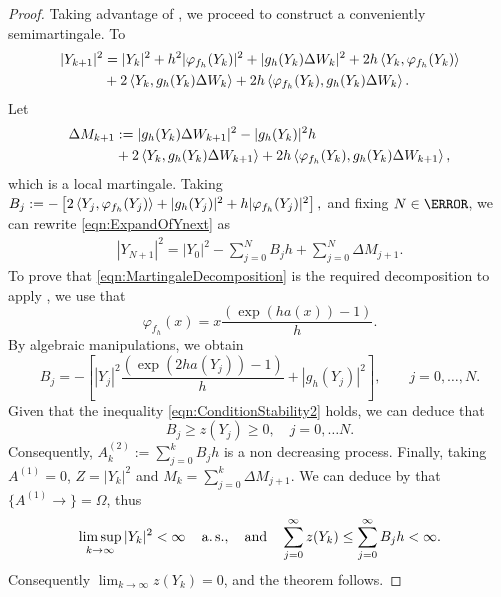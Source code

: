 \begin{proof}
	Taking advantage of , we proceed to construct a conveniently 
	semimartingale. To
	\begin{align}
		|Y_{k+1}|^2
			&=
				|Y_{k}|^2
				+h^2|\varphi_{f_h}(Y_{k})|^2 
				+|g_h(Y_k) \Delta W_k|^2 \notag 
				+2h\left\langle Y_k, \varphi_{f_h}(Y_{k})\right\rangle 
				\notag\\
			&
				+2\left\langle Y_k, g_h(Y_{k})\Delta W_k\right\rangle
				+2h\left\langle\varphi_{f_h}(Y_{k}), g_h(Y_{k})\Delta W_k\right\rangle.
			\label{eqn:ExpandOfYnext}
	\end{align}
	Let 
	\begin{align*}
		\Delta M_{k+1}
			&:=
				|g_h(Y_k)\Delta W_{k+1}|^2 - |g_h(Y_k)|^2 h \notag \\
			&
			+2\left\langle Y_k, g_h(Y_{k})\Delta W_{k+1}\right\rangle
			+2h\left\langle\varphi_{f_h}(Y_{k}), g_h(Y_{k})\Delta W_{k+1}\right\rangle, \notag
	\end{align*}
	which is a local martingale.
	Taking
	$ %
		B_j:=
			-\left[
					2\innerprod{Y_j}{\varphi_{f_h}(Y_j)}
					+|g_h(Y_j)|^2
				+h|\varphi_{f_h}(Y_j)|^2
			\right],
	$ %
	and fixing $N\in \N$, we can rewrite \eqref{eqn:ExpandOfYnext} as
	\begin{align}\label{eqn:MartingaleDecomposition}
		|Y_{N+1}|^2 = 
			|Y_0|^2
				-\sum_{j=0}^{N} B_j h
				+\sum_{j=0}^{N} \Delta M_{j+1}.
	\end{align} 
	To prove that \eqref{eqn:MartingaleDecomposition} is the required decomposition to apply
	, we use that
	\begin{equation}\label{eqn:varphih(x)}
		\varphi_{f_h}(x)
			= x\frac{\left(\exp(h a(x))-1\right)}{h}.
	\end{equation}
	By algebraic manipulations, we obtain
	\begin{equation*}
		B_j=
		-\left[
			|Y_j|^2\frac{(\exp(2h a(Y_j))-1)}{h}
			+|g_h(Y_j)|^2
		\right],
		\qquad
		 j=0,\dots,N.
	\end{equation*}
	Given that the inequality \eqref{eqn:ConditionStability2} holds, we can deduce that
	$$
		B_j\geq z(Y_j) \geq 0, \quad j=0,\ldots N.
	$$
	Consequently, $A_k^{(2)}:=\sum_{j=0}^k B_jh$ is a non decreasing process.
	Finally, taking $A^{(1)}=0$,  $Z=|Y_k|^2$ and $M_k=\sum_{j=0}^k \Delta M_{j+1}$.
	We can deduce  by  that $\{A^{(1)}\to\}=\Omega$, thus
	\begin{align*}
	 \limsup_{k\to \infty}
			|Y_k|^2 < \infty \quad \operatorname*{a.s.},
		\quad \text{and} \quad
		\sum_{j=0}^\infty z(Y_k) 
		\leq 
		\sum_{j=0}^\infty B_jh < \infty.
	\end{align*}
	Consequently
	$
		\lim_{k\to \infty} z(Y_k) =0
	$,
	and the theorem follows.
\end{proof}
%
